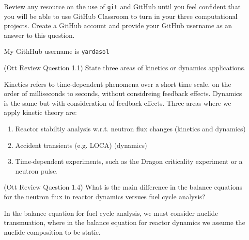 \documentclass[11pt,addpoints,answers]{exam}
\begin{document}
\begin{questions}
        \question[20] Review any resource on the use of \texttt{git} and 
                GitHub until you feel confident that you will be able to use 
                GitHub Classroom to turn in your three computational projects. 
                Create a GitHub account and provide your GitHub 
                username as an answer to this question.
                \begin{solution}
                    My GithHub username is \verb.yardasol.
                \end{solution}

        \question[10] (Ott Review Question 1.1)
        State three areas of kinetics or dynamics applications.
                \begin{solution}
                    Kinetics refers to time-dependent phenomena over a short
                    time scale, on the order of milliseconds to seconds, without
                    considreing feedback effects. Dynamics is the same but with
                    consideration of feedback effects. Three areas where
                    we apply kinetic theory are:
                    \begin{enumerate}
                        \item Reactor stabiltiy analysis w.r.t. neutron flux
                            changes (kinetics and dynamics)
                        \item Accident transients (e.g. LOCA) (dynamics)
                        \item Time-dependent experiments, such as the Dragon
                            criticality experiment or a neutron pulse.
                    \end{enumerate}
                \end{solution}

        \question[10] (Ott Review Question 1.4)
        What is the main difference in the balance equations for the neutron 
        flux in reactor dynamics versues fuel cycle analysis?
                \begin{solution}
                    In the balance equation for fuel cycle analysis, we must
                    consider nuclide transmuation, where in the balance equation
                    for reactor dynamics we assume the nuclide composition to
                    be static.
                \end{solution}


\end{questions}
\end{document}
